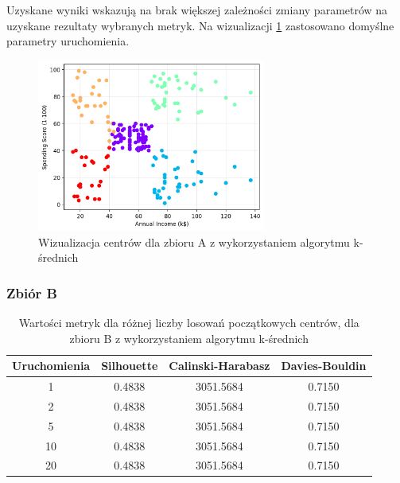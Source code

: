 \documentclass[a4paper,11pt]{article}
\begin{document}
Uzyskane wyniki wskazują na brak większej zależności zmiany parametrów na uzyskane rezultaty wybranych metryk. Na wizualizacji \ref{tab:km_a_wis} zastosowano domyślne parametry uruchomienia.

\begin{figure}[H]
    \centering
    \includegraphics[width=0.67\textwidth]{images2/kmeans/Kmeans_Customer.png}
    \caption{Wizualizacja centrów dla zbioru A z wykorzystaniem algorytmu k-średnich}
    \label{tab:km_a_wis}
\end{figure}

\subsubsection*{Zbiór B}

\begin{table}[H]
    \centering
    \begin{tabular}{|c|c|c|c|}
    \hline
    \textbf{Uruchomienia} & \textbf{Silhouette} & \textbf{Calinski-Harabasz} & \textbf{Davies-Bouldin} \\ \hline
    1  & 0.4838 & 3051.5684 & 0.7150 \\ \hline
    2  & 0.4838 & 3051.5684 & 0.7150 \\ \hline
    5  & 0.4838 & 3051.5684 & 0.7150 \\ \hline
    10 & 0.4838 & 3051.5684 & 0.7150 \\ \hline
    20 & 0.4838 & 3051.5684 & 0.7150 \\ \hline
    \end{tabular}
    \caption{Wartości metryk dla różnej liczby losowań początkowych centrów, dla zbioru B z wykorzystaniem algorytmu k-średnich}
    \label{tab:km_b_1}
\end{table}
\end{document}

